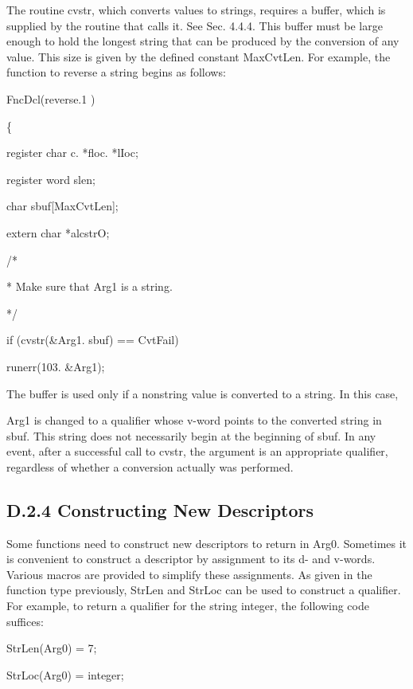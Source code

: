 The routine cvstr, which converts values to strings, requires a
buffer, which is supplied by the routine that calls it.  See
Sec. 4.4.4. This buffer must be large enough to hold the longest
string that can be produced by the conversion of any value. This size
is given by the defined constant MaxCvtLen. For example, the function
to reverse a string begins as follows:

{\ttfamily\mdseries
FncDcl(reverse.1 )}

{\ttfamily\mdseries
\{}

{\ttfamily\mdseries
register char c. *floc. *lIoc;}

{\ttfamily\mdseries
register word slen;}

{\ttfamily\mdseries
char sbuf[MaxCvtLen];}

{\ttfamily\mdseries
extern char *alcstrO;}

{\ttfamily\mdseries
/*}

{\ttfamily\mdseries
* Make sure that Arg1 is a string.}

{\ttfamily\mdseries
*/}

{\ttfamily\mdseries
if (cvstr(\&Arg1. sbuf) == CvtFail)}

{\ttfamily\mdseries
runerr(103. \&Arg1);}

The buffer is used only if a nonstring value is converted to a
string. In this case,

Arg1 is changed to a qualifier whose v-word points to the converted
string in sbuf. This string does not necessarily begin at the
beginning of sbuf. In any event, after a successful call to cvstr, the
argument is an appropriate qualifier, regardless of whether a
conversion actually was performed.

\subsection{D.2.4 Constructing New Descriptors}

Some functions need to construct new descriptors to return in
Arg0. Sometimes it is convenient to construct a descriptor by
assignment to its d- and v-words. Various macros are provided to
simplify these assignments. As given in the function type previously,
StrLen and StrLoc can be used to construct a qualifier. For example,
to return a qualifier for the string
{\textquotedbl}integer{\textquotedbl}, the following code suffices:

{\ttfamily\mdseries
StrLen(Arg0) = 7;}

{\ttfamily\mdseries
StrLoc(Arg0) = {\textquotedbl}integer{\textquotedbl};}

